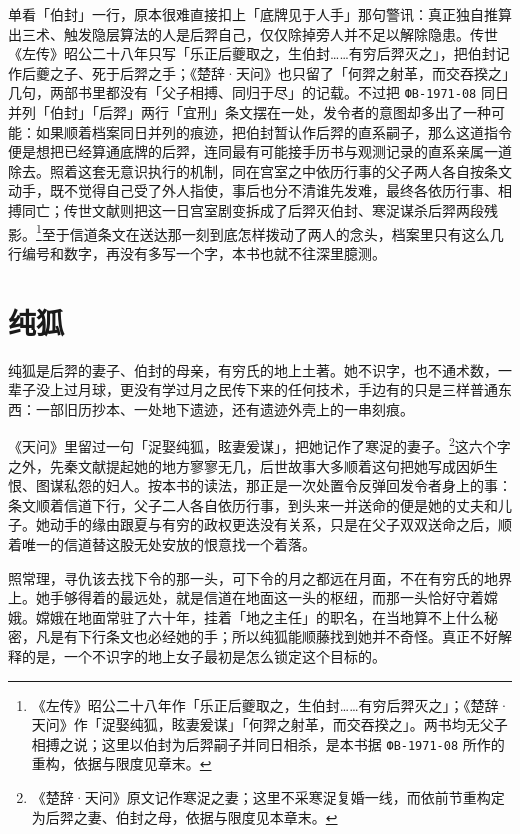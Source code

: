单看「伯封」一行，原本很难直接扣上「底牌见于人手」那句警讯：真正独自推算出三术、触发隐层算法的人是后羿自己，仅仅除掉旁人并不足以解除隐患。传世《左传》昭公二十八年只写「乐正后夔取之，生伯封……有穷后羿灭之」，把伯封记作后夔之子、死于后羿之手；《楚辞·天问》也只留了「何羿之射革，而交吞揆之」几句，两部书里都没有「父子相搏、同归于尽」的记载。不过把 \texttt{ФВ-1971-08} 同日并列「伯封」「后羿」两行「宜刑」条文摆在一处，发令者的意图却多出了一种可能：如果顺着档案同日并列的痕迹，把伯封暂认作后羿的直系嗣子，那么这道指令便是想把已经算通底牌的后羿，连同最有可能接手历书与观测记录的直系亲属一道除去。照着这套无意识执行的机制，同在宫室之中依历行事的父子两人各自按条文动手，既不觉得自己受了外人指使，事后也分不清谁先发难，最终各依历行事、相搏同亡；传世文献则把这一日宫室剧变拆成了后羿灭伯封、寒浞谋杀后羿两段残影。\footnote{《左传》昭公二十八年作「乐正后夔取之，生伯封……有穷后羿灭之」；《楚辞·天问》作「浞娶纯狐，眩妻爰谋」「何羿之射革，而交吞揆之」。两书均无父子相搏之说；这里以伯封为后羿嗣子并同日相杀，是本书据 \texttt{ФВ-1971-08} 所作的重构，依据与限度见章末。}至于信道条文在送达那一刻到底怎样拨动了两人的念头，档案里只有这么几行编号和数字，再没有多写一个字，本书也就不往深里臆测。

\section{纯狐}

纯狐是后羿的妻子、伯封的母亲，有穷氏的地上土著。她不识字，也不通术数，一辈子没上过月球，更没有学过月之民传下来的任何技术，手边有的只是三样普通东西：一部旧历抄本、一处地下遗迹，还有遗迹外壳上的一串刻痕。

《天问》里留过一句「浞娶纯狐，眩妻爰谋」，把她记作了寒浞的妻子。\footnote{《楚辞·天问》原文记作寒浞之妻；这里不采寒浞复婚一线，而依前节重构定为后羿之妻、伯封之母，依据与限度见本章末。}这六个字之外，先秦文献提起她的地方寥寥无几，后世故事大多顺着这句把她写成因妒生恨、图谋私怨的妇人。按本书的读法，那正是一次处置令反弹回发令者身上的事：条文顺着信道下行，父子二人各自依历行事，到头来一并送命的便是她的丈夫和儿子。她动手的缘由跟夏与有穷的政权更迭没有关系，只是在父子双双送命之后，顺着唯一的信道替这股无处安放的恨意找一个着落。

照常理，寻仇该去找下令的那一头，可下令的月之都远在月面，不在有穷氏的地界上。她手够得着的最远处，就是信道在地面这一头的枢纽，而那一头恰好守着嫦娥。嫦娥在地面常驻了六十年，挂着「地之主任」的职名，在当地算不上什么秘密，凡是有下行条文也必经她的手；所以纯狐能顺藤找到她并不奇怪。真正不好解释的是，一个不识字的地上女子最初是怎么锁定这个目标的。

